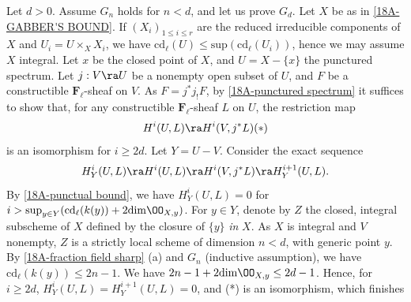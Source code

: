 \documentclass[10pt]{../fichiers-configuration-latex/smfart}
\begin{document}
\medskip Let $d >0$. Assume $G_n$ holds for $n < d$, and let us prove $G_d$. Let $X$ be as in
\ref{18A-GABBER'S BOUND}. If $(X_i)_{1\le i \le r}$ are the reduced irreducible components of $X$
and $U_i = U \times_X X_i$, we have $\mathrm{cd}_{\ell}(U) \le \mathrm{sup}(
\mathrm{cd}_{\ell}(U_i))$, hence we may assume $X$ integral. Let $x$ be the closed point of $X$, and
$U = X - \{x\}$ the punctured spectrum. Let $j : V \ra U$ be a nonempty open subset of $U$, and $F$
be a constructible $\mathbf{F}_{\ell}$-sheaf on $V$. As $F = j^*j_!F$, by \ref{18A-punctured
spectrum} it suffices to show that, for any constructible $\mathbf{F}_{\ell}$-sheaf $L$ on $U$, the
restriction map $$ H^i(U,L) \ra H^i(V,j^*L) \leqno (*) $$ is an isomorphism for $i \ge 2d$. Let $Y =
U - V$. Consider the exact sequence $$ H^i_Y(U,L) \ra H^i(U,L) \ra H^i(V,j^*L) \ra H^{i+1}_Y(U,L).
$$ By \ref{18A-punctual bound}, we have $H^i_Y(U,L) = 0$ for $i > \mathrm{sup}_{y \in Y}
(\mathrm{cd}_{\ell}(k(y)) + 2 \mathrm{dim} \OO_{X,y})$. For $y \in Y$, denote by $Z$ the
closed, integral subscheme of $X$ defined by the closure of $\{y\}$ \textit{in} $X$. As $X$ is
integral and $V$ nonempty, $Z$ is a strictly local scheme of dimension $n < d$, with generic point
$y$.    By \ref{18A-fraction field sharp} (a) and $G_n$ (inductive assumption), we have
$\mathrm{cd}_{\ell}(k(y)) \le 2n -1$. We have $2n - 1 + 2\mathrm{dim}\OO_{X,y} \le 2d-1$.
Hence, for $i \ge 2d$, $H^i_Y(U,L) = H^{i+1}_Y(U,L) = 0$, and (*) is an isomorphism, which finishes
\end{document}
